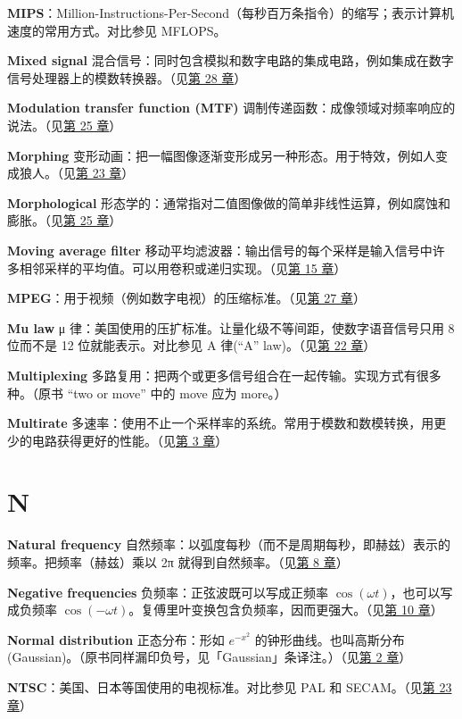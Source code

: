 \textbf{MIPS}：Million-Instructions-Per-Second（每秒百万条指令）的缩写；表示计算机速度的常用方式。对比参见
MFLOPS。

\textbf{Mixed signal}
混合信号：同时包含模拟和数字电路的集成电路，例如集成在数字信号处理器上的模数转换器。（见\hyperref[ch-28]{第
28 章}）

\textbf{Modulation transfer function (MTF)}
调制传递函数：成像领域对频率响应的说法。（见\hyperref[ch-25]{第 25 章}）

\textbf{Morphing}
变形动画：把一幅图像逐渐变形成另一种形态。用于特效，例如人变成狼人。（见\hyperref[ch-23]{第
23 章}）

\textbf{Morphological}
形态学的：通常指对二值图像做的简单非线性运算，例如腐蚀和膨胀。（见\hyperref[ch-25]{第
25 章}）

\textbf{Moving average filter}
移动平均滤波器：输出信号的每个采样是输入信号中许多相邻采样的平均值。可以用卷积或递归实现。（见\hyperref[ch-15]{第
15 章}）

\textbf{MPEG}：用于视频（例如数字电视）的压缩标准。（见\hyperref[ch-27]{第
27 章}）

\textbf{Mu law} μ
律：美国使用的压扩标准。让量化级不等间距，使数字语音信号只用 8 位而不是
12 位就能表示。对比参见 A 律(``A'' law)。（见\hyperref[ch-22]{第 22
章}）

\textbf{Multiplexing}
多路复用：把两个或更多信号组合在一起传输。实现方式有很多种。（原书 ``two
or move'' 中的 move 应为 more。）

\textbf{Multirate}
多速率：使用不止一个采样率的系统。常用于模数和数模转换，用更少的电路获得更好的性能。（见\hyperref[ch-03]{第
3 章}）

\section{N}

\textbf{Natural frequency}
自然频率：以弧度每秒（而不是周期每秒，即赫兹）表示的频率。把频率（赫兹）乘以
2π 就得到自然频率。（见\hyperref[ch-08]{第 8 章}）

\textbf{Negative frequencies} 负频率：正弦波既可以写成正频率
\(\cos(\omega t)\)，也可以写成负频率
\(\cos(-\omega t)\)。复傅里叶变换包含负频率，因而更强大。（见\hyperref[ch-10]{第
10 章}）

\textbf{Normal distribution} 正态分布：形如 \(e^{-x^2}\)
的钟形曲线。也叫高斯分布(Gaussian)。（原书同样漏印负号，见「Gaussian」条译注。）（见\hyperref[ch-02]{第
2 章}）

\textbf{NTSC}：美国、日本等国使用的电视标准。对比参见 PAL 和
SECAM。（见\hyperref[ch-23]{第 23 章}）

